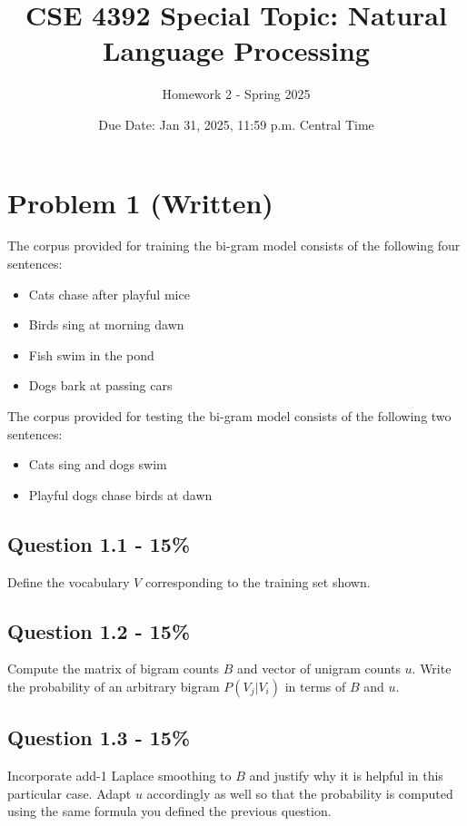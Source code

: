 \documentclass{article}
\newcommand{\answerbox}{
    \vspace{7cm} %
}
\newcommand{\answerboxbig}{
    \vspace{20cm} %
}
\newcommand{\answerboxsmall}{
    \vspace{3cm} %
}
\begin{document}
\title{CSE 4392 Special Topic: Natural Language Processing}
\author{Homework 2 - Spring 2025}
\date{Due Date: Jan 31, 2025, 11:59 p.m. Central Time}
\maketitle
\thispagestyle{fancy}


\section*{Problem 1 (Written)}
The corpus provided for training the bi-gram model consists of the following four sentences:

\begin{itemize}
    \item Cats chase after playful mice
    \item Birds sing at morning dawn
    \item Fish swim in the pond
    \item Dogs bark at passing cars
\end{itemize}

The corpus provided for testing the bi-gram model consists of the following two sentences:

\begin{itemize}
    \item Cats sing and dogs swim
    \item Playful dogs chase birds at dawn
\end{itemize}

\newpage

\subsection*{Question 1.1 - 15\%}
Define the vocabulary $V$ corresponding to the training set shown.

\answerboxsmall

\subsection*{Question 1.2 - 15\%}
Compute the matrix of bigram counts $B$ and vector of unigram counts $u$. Write the probability of an arbitrary bigram $P(V_j|V_i)$ in terms of $B$ and $u$.

\answerboxbig


\subsection*{Question 1.3 - 15\%}
Incorporate add-1 Laplace smoothing to $B$ and justify why it is helpful in this particular case. Adapt $u$ accordingly as well so that the probability is computed using the same formula you defined the previous question.
\answerbox
\end{document}
